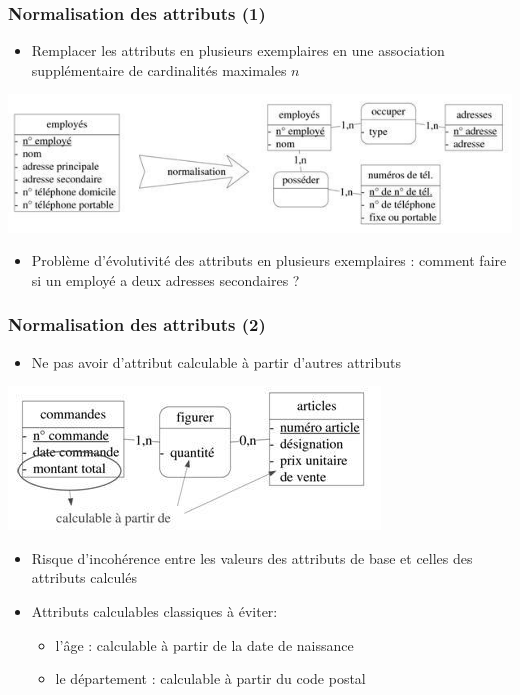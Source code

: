 \begin{frame}
  \frametitle{Normalisation des attributs (1)}
  \begin{itemize}
    \item Remplacer les attributs en plusieurs exemplaires en une association supplémentaire de cardinalités
      maximales $n$
  \end{itemize}
  \begin{center}
    \includegraphics[width=0.9\linewidth]{normalisation_attributs.jpg}
  \end{center}
  \begin{itemize}
    \item Problème d'évolutivité des attributs en plusieurs exemplaires : comment faire si un employé a deux
      adresses secondaires ?
  \end{itemize}
\end{frame}

\begin{frame}
  \frametitle{Normalisation des attributs (2)}
  \begin{itemize}
    \item Ne pas avoir d'attribut calculable à partir d'autres attributs
  \end{itemize}
  \begin{center}
    \includegraphics[width=0.6\linewidth]{attribut_calculable.jpg}
  \end{center}
  \begin{itemize}
    \item Risque d'incohérence entre les valeurs des attributs de base et celles des attributs calculés
    \item Attributs calculables classiques à éviter:
      \begin{itemize}
        \item l'âge : calculable à partir de la date de naissance
        \item le département : calculable à partir du code postal
      \end{itemize}
  \end{itemize}
\end{frame}


